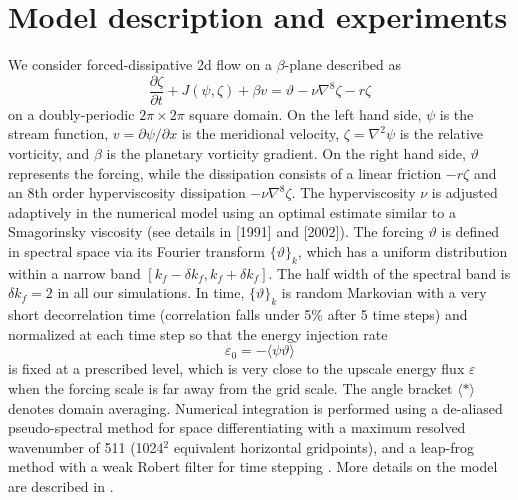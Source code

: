 \documentclass{jfm}
\begin{document}
\section{Model description and experiments}

We consider forced-dissipative 2d flow on a $\beta$-plane described as
\begin{equation}
\frac{\partial\zeta}{\partial t}+J(\psi,\zeta)+\beta v=\vartheta-\nu\nabla^{8}\zeta-r\zeta\label{eq:barotropic_vorticity_eq}
\end{equation}
on a doubly-periodic $2\pi\times2\pi$ square domain. On
the left hand side, $\psi$ is the stream function, $v=\partial\psi/\partial x$
is the meridional velocity, $\zeta=\nabla^{2}\psi$ is the relative vorticity,
and $\beta$ is the planetary vorticity gradient. On the right hand
side, $\vartheta$ represents the forcing, while the dissipation consists
of a linear friction $-r\zeta$ and an 8th order hyperviscosity dissipation
$-\nu\nabla^{8}\zeta$. The hyperviscosity $\nu$ is adjusted adaptively
in the numerical model using an optimal estimate similar to a 
Smagorinsky viscosity (see details in \citeauthor{Maltrud1991}
{[}1991{]} and \citeauthor{Smith2002} {[}2002{]}). 
The forcing $\vartheta$ is defined
in spectral space via its Fourier transform $\{\vartheta\}_{k}$,
which has a uniform distribution within a narrow band $[k_{f}-\delta k_{f},k_{f}+\delta k_{f}]$.
The half width of the spectral band is $\delta k_{f}=2$ in all our
simulations. In time, $\{\vartheta\}_{k}$ is random Markovian with
a very short decorrelation time (correlation falls under 5\% after
5 time steps) and normalized at each time step so that the energy
injection rate
\begin{equation}
\varepsilon_{0}=-\langle\psi\vartheta\rangle\label{eq:energy_injection_rate}
\end{equation}
is fixed at a prescribed level, which is very close to the upscale
energy flux $\varepsilon$ when the forcing scale is far away from the grid
scale. The angle bracket $\langle*\rangle$ denotes domain averaging.
Numerical integration is performed using a de-aliased pseudo-spectral
method for space differentiating with a maximum resolved wavenumber
of 511 (1024$^{2}$ equivalent horizontal gridpoints), and a leap-frog
method with a weak Robert filter for time stepping \citep{Patterson1971}.
More details on the model are described in \citet{Smith2002}.
\end{document}
